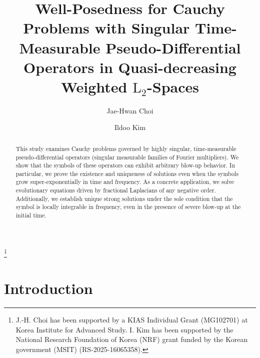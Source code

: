 \documentclass[11pt,reqno]{amsart}
\theoremstyle{definition}
\theoremstyle{remark}
\numberwithin{equation}{section}
\newcommand{\mysection}[1]{\section{#1}}
\begin{document}
\title[A weighted $\mathrm{L}_2$-theory for Cauchy problems with non-integrable P-D operators]
{Well-Posedness for Cauchy Problems with Singular Time-Measurable Pseudo-Differential Operators in Quasi-decreasing Weighted $\mathrm{L}_2$-Spaces}

\author[J.-H. Choi]{Jae-Hwan Choi}
\address[J.-H. Choi]{School of Mathematics, Korea Institute for Advanced Study, 85 Hoegiro, Dongdaemun-gu, Seoul 02455, Republic of Korea}

\author[I. Kim]{Ildoo Kim}
\address[I. Kim]{Department of Mathematics, Korea University, 145 Anam-ro, Seongbuk-gu, Seoul, 02841, Republic of Korea}


\thanks{J.-H. Choi has been supported by a KIAS Individual Grant (MG102701) at Korea Institute for Advanced Study.
I. Kim has been supported by the National Research Foundation of Korea (NRF) grant funded by the Korean government (MSIT) (RS-2025-16065358).}







\begin{abstract}
This study examines Cauchy problems governed by highly singular, time-measurable pseudo-differential operators (singular measurable families of Fourier multipliers). 
We show that the symbols of these operators can exhibit arbitrary blow-up behavior. 
In particular, we prove the existence and uniqueness of solutions even when the symbols grow super-exponentially in time and frequency. 
As a concrete application, we solve evolutionary equations driven by fractional Laplacians of any negative order. 
Additionally, we establish unique strong solutions under the sole condition that the symbol is locally integrable in frequency, even in the presence of severe blow-up at the initial time.
\end{abstract}
\maketitle

\mysection{Introduction}
\end{document}
